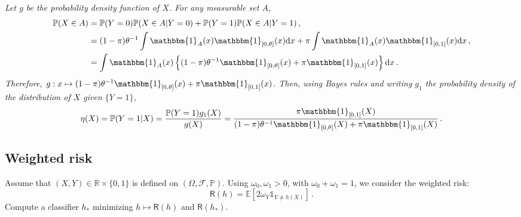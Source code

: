 \documentclass[a4paper,10pt,fleqn]{article}
\newcommand{\eqsp}{\,}
\newcommand{\rmd}{\mathrm{d}}
\newcommand{\bP}{\mathbb{P}}
\newcommand{\1}{\ensuremath{\mathbbm{1}}}
\newcommand{\bE}{\mathbb{E}}
\begin{document}
\vspace{.2cm}

{\em
Let $g$ be the probability density function of $X$. For any measurable set $A$,
\begin{align*}
\mathbb{P}(X\in A) &= \mathbb{P}(Y=0)\mathbb{P}(X\in A|Y=0) + \mathbb{P}(Y=1)\mathbb{P}(X\in A|Y=1)\,,\\
&= (1-\pi) \theta^{-1}\int \1_A(x)\1_{[0,\theta]}(x) \rmd x + \pi \int \1_A(x)\1_{[0,1]}(x) \rmd x\,,\\
&= \int \1_A(x)\left\{ (1-\pi) \theta^{-1}\1_{[0,\theta]}(x) + \pi\1_{[0,1]}(x)\right\} \rmd x\,.
\end{align*}
Therefore, $g:x\mapsto  (1-\pi) \theta^{-1}\1_{[0,\theta]}(x) + \pi\1_{[0,1]}(x)$. Then, using Bayes rules and writing $g_1$ the probability density of the distribution of $X$ given $\{Y=1\}$,
$$
\eta(X) = \mathbb{P}(Y=1 |X) = \frac{ \mathbb{P}(Y=1)g_1(X)}{g(X)} = \frac{\pi \1_{[0,1]}(X)}{(1-\pi) \theta^{-1}\1_{[0,\theta]}(X) + \pi\1_{[0,1]}(X)}\eqsp.
$$

}


\subsection{Weighted risk}
Assume that $(X,Y)\in\mathbb{R}\times\{0,1\}$ is defined on $(\Omega,\mathcal{F},\mathbb{P})$. Using $\omega_0, \omega_1 >0$, with $\omega_0+\omega_1 = 1$, we  consider the weighted risk:
$$
\mathsf{R}(h) = \bE[2\omega_Y \mathds{1}_{Y\neq h(X)}]\,.
$$
Compute a classifier $h_*$ minimizing $h\mapsto \mathsf{R}(h)$ and $\mathsf{R}(h_*)$.

\vspace{.2cm}
\end{document}
